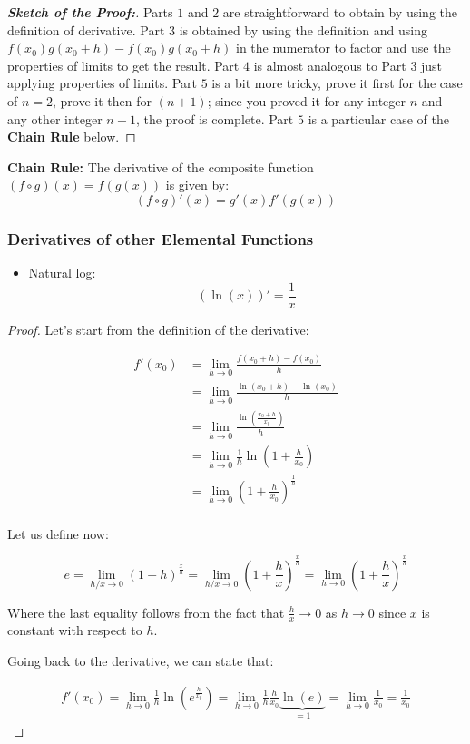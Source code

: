 \documentclass[11pt]{article}
\providecommand{\tightlist}{%
      \setlength{\itemsep}{0pt}\setlength{\parskip}{0pt}}
\theoremstyle{definition}
\theoremstyle{plain}
\begin{document}
\begin{proof}[\textbf{Sketch of the Proof:}]
Parts \(1\) and \(2\) are straightforward
to obtain by using the definition of derivative. Part \(3\) is obtained
by using the definition and using \(f(x_0)g(x_0+h) - f(x_0)g(x_0+h)\) in
the numerator to factor and use the properties of limits to get the
result. Part \(4\) is almost analogous to Part \(3\) just applying
properties of limits. Part \(5\) is a bit more tricky, prove it first for the case of $n = 2$, prove it then for $(n+1)$; since you proved it for any integer $n$ and any other integer $n+1$, the proof is complete. Part \(5\) is a particular case of the \textbf{Chain Rule} below.
\end{proof}

\textbf{Chain Rule:} The derivative of the composite function
\((f\circ g)(x) = f(g(x))\) is given by: \[
\left(f\circ g\right)'(x) = g'(x)f'\left(g(x)\right)
\]

\subsubsection{Derivatives of other Elemental
Functions}\label{derivatives-of-other-elemental-functions}

\begin{itemize}
\tightlist
\item
  Natural log: \[\left(\ln(x)\right)' = \frac{1}{x}\]
\end{itemize}

\begin{proof}
Let's start from the definition of the derivative:

\begin{align*}
f'(x_0) &= \lim_{h\rightarrow 0}{\frac{f(x_0+h)-f(x_0)}{h}} \\
&= \lim_{h\rightarrow 0}{\frac{\ln(x_0+h)-\ln(x_0)}{h}} \\
&= \lim_{h\rightarrow 0}{\frac{\ln\left(\frac{x_0 + h}{x_0}\right)}{h}} \\
&= \lim_{h\rightarrow 0}{\frac{1}{h}\ln\left(1+\frac{h}{x_0}\right)} \\
&= \lim_{h\rightarrow 0}{\left(1+\frac{h}{x_0}\right)^{\frac{1}{h}}} \\
\end{align*}

Let us define now:

\[
e = \lim_{h / x \rightarrow 0}{\left(1+h\right)^{\frac{x}{h}}} = \lim_{h / x\rightarrow 0}{\left(1+\frac{h}{x}\right)^{\frac{x}{h}}} = \lim_{h\rightarrow 0}{\left(1+\frac{h}{x}\right)^{\frac{x}{h}}}
\]

Where the last equality follows from the fact that
\(\frac{h}{x}\rightarrow 0\) as \(h\rightarrow 0\) since \(x\) is
constant with respect to \(h\).

Going back to the derivative, we can state that:

\begin{align*}
f'(x_0) = \lim_{h\rightarrow 0}{\frac{1}{h}\ln\left(e^{\frac{h}{x_0}}\right)} = \lim_{h\rightarrow 0}{\frac{1}{h}\frac{h}{x_0}\underset{=1}{\underbrace{\ln(e)}}} = \lim_{h\rightarrow 0}{\frac{1}{x_0}} = \frac{1}{x_0}
\end{align*}
\end{proof}
\end{document}

